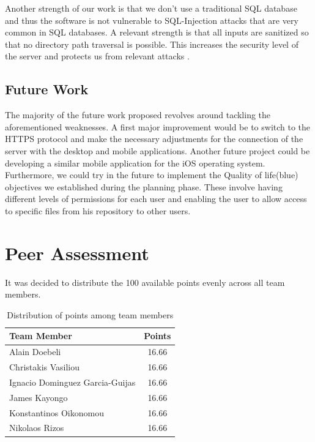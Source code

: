 \documentclass[11pt]{article}
\begin{document}
Another strength of our work is that we don’t use a traditional SQL database and thus the software is not vulnerable to SQL-Injection attacks \cite{halfond:06} that are very common in SQL databases. A relevant strength is that all inputs are sanitized so that no directory path traversal is possible. This increases the security level of the server and protects us from relevant attacks \cite{danforth:09}.

\subsection{Future Work}

The majority of the future work proposed revolves around tackling the aforementioned weaknesses. A first major improvement would be to switch to the HTTPS protocol and make the necessary adjustments for the connection of the server with the desktop and mobile applications. Another future project could be developing a similar mobile application for the iOS operating system. Furthermore, we could try in the future to implement the Quality of life(blue) objectives we established during the planning phase. These involve having different levels of permissions for each user and enabling the user to allow access to specific files from his repository to other users.


\section{Peer Assessment}

It was decided to distribute the 100 available points evenly across all team members.

\begin{table}[H]
	\centering
	\begin{tabular}{lc}
		\hline
		\textbf{Team Member} & \textbf{Points} \\
		\hline
		Alain Doebeli & 16.66 \\
		Christakis Vasiliou & 16.66 \\
		Ignacio Dominguez Garcia-Guijas & 16.66 \\
		James Kayongo & 16.66 \\
		Konstantinos Oikonomou & 16.66 \\
		Nikolaos Rizos & 16.66 \\
		\hline
	\end{tabular}
	\caption{Distribution of points among team members}
	\label{tab:points}
\end{table}
\end{document}
